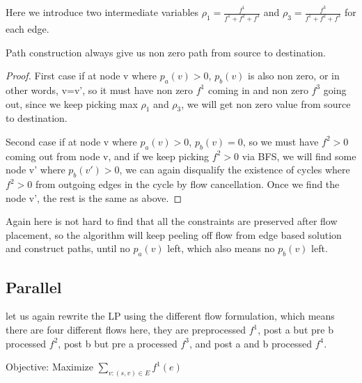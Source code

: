 \documentclass[twoside,leqno, 11pt]{article}
\begin{document}
Here we introduce two intermediate variables $\rho_1 = \frac{f^1} {f^1+f^2+f^3}$ and $\rho_3 = \frac{f^3} {f^1+f^2+f^3}$ for each edge. 
\begin{lemma}
Path construction always give us non zero path from source to destination. 
\end{lemma}
\begin{proof}
First case if at node v where $p_a(v)>0$, $p_b(v)$ is also non zero, or in other words, v=v', so it must have non zero $f^1$ coming in and non zero $f^3$ going out, since we keep picking max $\rho_1 $ and $\rho_3$, we will get non zero value from source to destination.

Second case if at node v where $p_a(v)>0$, $p_b(v)=0$, so we must have $f^2>0$ coming out from node v, and if we keep picking $f^2>0$ via BFS, we will find some node v' where $p_b(v')>0$, we can again disqualify the existence of cycles where $f^2>0$ from outgoing edges in the cycle by flow cancellation. Once we find the node v', the rest is the same as above.  
\end{proof}

Again here is not hard to find that all the constraints are preserved after flow placement, so the algorithm will keep peeling off flow from edge based solution and construct paths, until no $p_a(v) $ left, which also means no $p_b(v)$ left. 
\subsection{Parallel}
let us again rewrite the LP using the different flow formulation, which means there are four different flows here, they are preprocessed $f^1$, post a but pre b processed $f^2$, post b but pre a processed $f^3$, and post a and b processed $f^4$.

Objective: Maximize $\sum \limits_{v: (s, v) \in E} f^1(e) $ 
\end{document}
